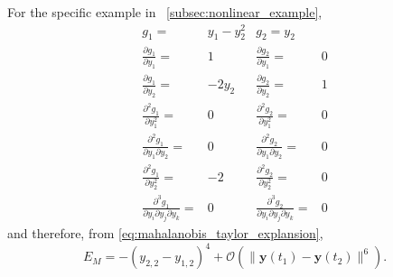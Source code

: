 For the specific example in \sec~\ref{subsec:nonlinear_example},
\begin{equation}
\begin{aligned}
g_1 =& y_1 - y_2^2
&
g_2 = y_2
\\
\frac{\partial g_1}{\partial y_1} =& 1
&
\frac{\partial g_2}{\partial y_1} =& 0
\\
\frac{\partial g_1}{\partial y_2} =& -2 y_2
&
\frac{\partial g_2}{\partial y_2} =& 1
\\
\frac{\partial^2 g_1}{\partial y_1^2} =& 0
&
\frac{\partial^2 g_2}{\partial y_1^2} =& 0
\\
\frac{\partial^2 g_1}{\partial y_1 \partial y_2} =& 0
&
\frac{\partial^2 g_2}{\partial y_1 \partial y_2} =& 0
\\
\frac{\partial^2 g_1}{\partial y_2^2} =& -2
&
\frac{\partial^2 g_2}{\partial y_2^2} =& 0
\\
\frac{\partial^3 g_1}{\partial y_i \partial y_j \partial y_k} =& 0
&
\frac{\partial^3 g_2}{\partial y_i \partial y_j \partial y_k} =& 0
\end{aligned}
\end{equation}
%
and therefore, from \eqref{eq:mahalanobis_taylor_explansion},
%
\begin{equation}
E_M =
 -(y_{2,2} - y_{1,2})^4
 + \mathcal{O} (\|\mathbf{y}(t_1) - \mathbf{y}(t_2) \|^6 ) .
\end{equation}

